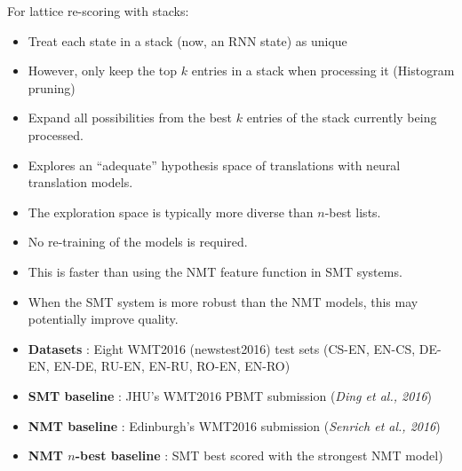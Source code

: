 \documentclass[landscape]{jhuslides3C}
\begin{document}
\vspace{10mm}
For lattice re-scoring with stacks:
\begin{itemize}
\item Treat each state in a stack (now, an RNN state) as unique
\item However, only keep the top $k$ entries in a stack when processing it (Histogram pruning)
\item Expand all possibilities from the best $k$ entries of the stack currently being processed.
\end{itemize}

\begin{itemize}
\item Explores an ``adequate'' hypothesis space of translations with neural translation models.
\item The exploration space is typically more diverse than $n$-best lists.
\item No re-training of the models is required.
\item This is faster than using the NMT feature function in SMT systems.
\item When the SMT system is more robust than the NMT models, this may potentially improve quality.
\end{itemize}

\vspace{10mm}
\begin{itemize}
\item \textbf{Datasets} : Eight WMT2016 (newstest2016) test sets (CS-EN, EN-CS, DE-EN, EN-DE, RU-EN, EN-RU, RO-EN, EN-RO)
\item \textbf{SMT baseline} : JHU's WMT2016 PBMT submission (\textit{Ding et al., 2016})
\item \textbf{NMT baseline} : Edinburgh's WMT2016 submission (\textit{Senrich et al., 2016})
\item \textbf{NMT $n$-best baseline} : SMT best scored with the strongest NMT model)
\end{itemize}
\end{document}
